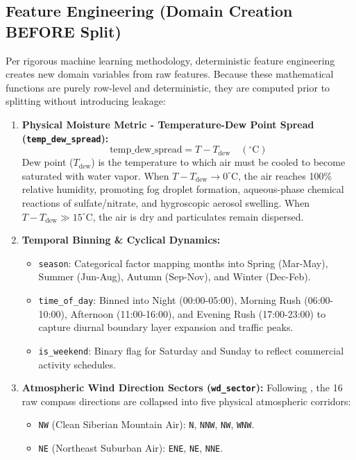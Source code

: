 \documentclass[a4paper,12pt,twocolumn]{article}
\begin{document}
\subsection{Feature Engineering (Domain Creation BEFORE Split)}
Per rigorous machine learning methodology, deterministic feature engineering creates new domain variables from raw features. Because these mathematical functions are purely row-level and deterministic, they are computed prior to splitting without introducing leakage:
\begin{enumerate}
    \item \textbf{Physical Moisture Metric - Temperature-Dew Point Spread (\texttt{temp\_dew\_spread}):}
    \begin{equation}
    \text{temp\_dew\_spread} = T - T_{\text{dew}} \quad (^\circ\text{C})
    \end{equation}
    Dew point ($T_{\text{dew}}$) is the temperature to which air must be cooled to become saturated with water vapor. When $T - T_{\text{dew}} \to 0^\circ\text{C}$, the air reaches 100\% relative humidity, promoting fog droplet formation, aqueous-phase chemical reactions of sulfate/nitrate, and hygroscopic aerosol swelling. When $T - T_{\text{dew}} \gg 15^\circ\text{C}$, the air is dry and particulates remain dispersed.
    \item \textbf{Temporal Binning \& Cyclical Dynamics:}
    \begin{itemize}
        \item \texttt{season}: Categorical factor mapping months into Spring (Mar-May), Summer (Jun-Aug), Autumn (Sep-Nov), and Winter (Dec-Feb).
        \item \texttt{time\_of\_day}: Binned into Night (00:00-05:00), Morning Rush (06:00-10:00), Afternoon (11:00-16:00), and Evening Rush (17:00-23:00) to capture diurnal boundary layer expansion and traffic peaks.
        \item \texttt{is\_weekend}: Binary flag for Saturday and Sunday to reflect commercial activity schedules.
    \end{itemize}
    \item \textbf{Atmospheric Wind Direction Sectors (\texttt{wd\_sector}):} Following \textcite{zhang2017clean}, the 16 raw compass directions are collapsed into five physical atmospheric corridors:
    \begin{itemize}
        \item \texttt{NW} (Clean Siberian Mountain Air): \texttt{N}, \texttt{NNW}, \texttt{NW}, \texttt{WNW}.
        \item \texttt{NE} (Northeast Suburban Air): \texttt{ENE}, \texttt{NE}, \texttt{NNE}.

\end{itemize}
\end{enumerate}
\end{document}
